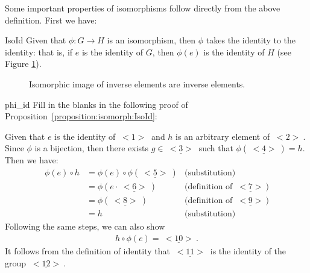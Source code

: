Some important properties of isomorphisms follow directly from the above definition. First we have:

\begin{prop}{IsoId}
Given that  $\phi : G \rightarrow H$ is an  isomorphism, then $\phi$ takes the identity to the identity: that is, if $e$ is the identity of $G$, then  $\phi(e)$ is the identity of $H$ (see Figure \ref{fig:isomorph:isomId}).
\end{prop}


\begin{figure}[htb]
	  \caption{\label{fig:isomorph:isomId} Isomorphic image of   inverse elements are  inverse elements. }
\end{figure}


\begin{exercise}{phi_id}
Fill in the blanks in the following proof of Proposition~\ref{proposition:isomorph:IsoId}:
\medskip

\noindent
Given that $e$ is the identity of \underline{$~<1>~$} and $h$ is an arbitrary element of \underline{$~<2>~$}.  Since $\phi$ is a bijection, then there exists $g \in \underline{~<3>~}$ such that $\phi(\underline{~<4>~}) = h$.  Then  we have:
\begin{align*}
\phi(e) \circ h &= \phi(e) \circ \phi(\underline{~<5>~}) & \textrm{(substitution)}\\
&= \phi( e \cdot \underline{~<6>~}) & \textrm{(definition of~} \underline{~<7>~})\\
&= \phi( \underline{~<8>~}) & \textrm{(definition of~} \underline{~<9>~})\\
&= h & \textrm{(substitution)}
\end{align*}
Following the same steps, we can also show
\begin{align*}
h \circ \phi(e) = \underline{~<10>~}.
\end{align*}
It follows from the definition of identity that $\underline{~<11>~}$ is the identity of the group $\underline{~<12>~}$.
\end{exercise}


